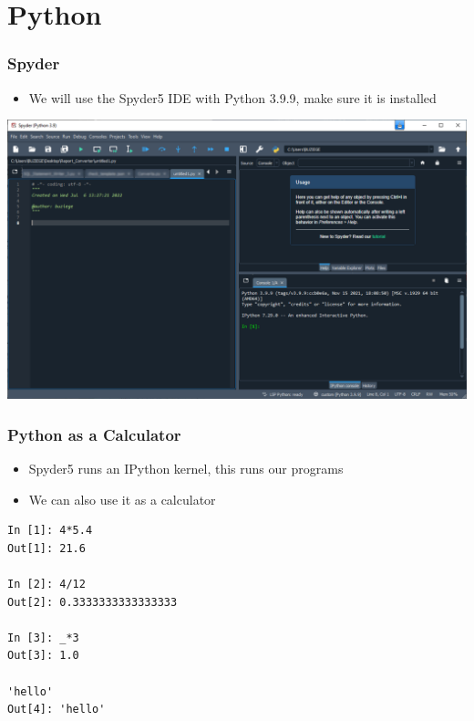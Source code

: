 \documentclass[ngerman]{beamer}
\begin{document}
\section{Python}

\begin{frame}
\frametitle{Spyder}

\begin{itemize}
	\item We will use the Spyder5 IDE with Python 3.9.9, make sure it is installed
\end{itemize}

\begin{center}
\includegraphics[width=\textwidth]{Pictures/Spyder5}
\end{center}

\end{frame}

\begin{frame}[fragile]
\frametitle{Python as a Calculator}

\begin{itemize}
\item Spyder5 runs an IPython kernel, this runs our programs
\item We can also use it as a calculator
\end{itemize}

\begin{lstlisting}[style=Python]
In [1]: 4*5.4
Out[1]: 21.6

In [2]: 4/12
Out[2]: 0.3333333333333333

In [3]: _*3
Out[3]: 1.0

'hello'
Out[4]: 'hello'
\end{lstlisting}

\end{frame}
\end{document}
